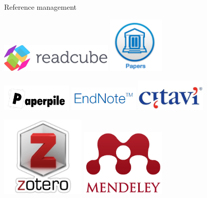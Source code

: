 \documentclass[10pt]{beamer}%
\begin{document}
\begin{frame}{Reference management}

\includegraphics[width=0.4\textwidth]{Figures/readcube} \hfill
\includegraphics[width=0.2\textwidth]{Figures/papers}

\includegraphics[width=0.25\textwidth]{Figures/reftruc}\hfill
\includegraphics[width=0.25\textwidth]{Figures/endnote}\hfill
\includegraphics[width=0.25\textwidth]{Figures/citavi}

\includegraphics[width=0.3\textwidth]{Figures/zotero}\hfill 
\includegraphics[width=0.3\textwidth]{Figures/mendeley}

\end{frame}
\end{document}
